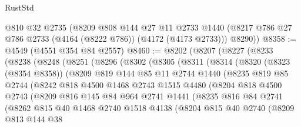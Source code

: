 \begin{lexlean}{RustStd}
\begin{coremodule}
      @810
      @32
      @2735
      (@8209
        @808
        @144
        @27
        @11
        @2733
        @1440
        (@8217 @786 @27 @786 @2733 (@4164 (@8222 @786)) (@4172 (@4173 @2733)))
        @8290))
@8358 := @4549 (@4551 @354 @84 @2557)
@8460 := @8202
    (@8207
      (@8227
        (@8233
          (@8238
            (@8248
              (@8251
                (@8296
                  (@8302
                    (@8305
                      (@8311
                        (@8314
                          (@8320
                            (@8323 (@8354 @8358))
                            (@8209
                              @819
                              @144
                              @85
                              @11
                              @2744
                              @1440
                              (@8235
                                @819
                                @85
                                @2744
                                (@8242
                                  @818
                                  @4500
                                  @1468
                                  @2743
                                  @1515
                                  @4480
                                  (@8204
                                    @818
                                    @4500
                                    @2743
                                    (@8209
                                      @816
                                      @145
                                      @84
                                      @964
                                      @2741
                                      @1441
                                      (@8235
                                        @816
                                        @84
                                        @2741
                                        (@8262
                                          @815
                                          @40
                                          @1468
                                          @2740
                                          @1518
                                          @4138
                                          (@8204
                                            @815
                                            @40
                                            @2740
                                            (@8209
                                              @813
                                              @144
                                              @38

\end{coremodule}
\end{lexlean}
